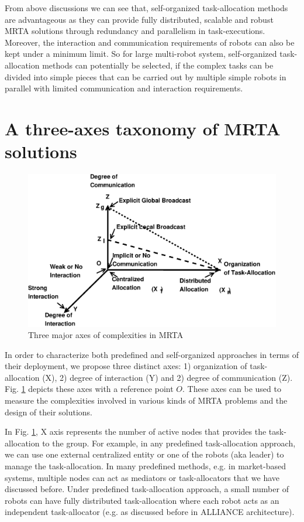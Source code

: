 \documentclass[final,5p,times,twocolumn]{elsarticle}
\begin{document}
From above discussions we can see that, self-organized task-allocation methods are advantageous as they can provide fully distributed, scalable and robust MRTA solutions through redundancy and parallelism in task-executions. Moreover, the interaction and communication requirements of robots can also be kept under a minimum limit.  So for large multi-robot system, self-organized task-allocation methods  can potentially be selected, if the complex tasks can be divided into simple pieces that can be carried out by multiple simple robots in parallel with limited communication and interaction requirements.
\section{A three-axes taxonomy of MRTA solutions}
\label{sec:taxonomy}
\begin{figure}
\centering
\includegraphics[width=\linewidth, angle=0]
{./images/mrta-lines.eps}
\caption{ Three major axes of complexities in MRTA}
\label{fig:mrta-complexities} %
\end{figure}
In order to characterize both predefined and self-organized approaches in terms of their deployment, we propose three distinct axes: 1) organization of task-allocation (X), 2) degree of interaction (Y) and 2) degree of communication (Z). Fig. \ref{fig:mrta-complexities} depicts these axes with a reference point $O$. These axes can be used to measure the complexities involved in various kinds of MRTA problems and the design of their solutions. 

In Fig. \ref{fig:mrta-complexities}, X axis represents the number of active nodes that provides the task-allocation to the group. For example, in any predefined  task-allocation approach, we can use one external centralized entity or one of the robots (aka leader) to manage the task-allocation. In many predefined methods, e.g. in market-based systems,  multiple nodes can act as mediators or task-allocators that we have discussed before. Under predefined task-allocation approach,  a small number of robots can have fully distributed task-allocation where each robot acts as an independent task-allocator (e.g. as discussed before in ALLIANCE architecture). 
\end{document}
